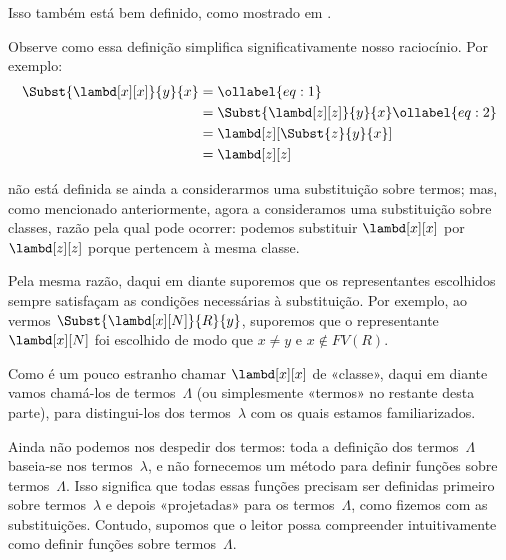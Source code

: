 \documentclass[../../../include/open-logic-section]{subfiles}
\begin{document}
Isso também está bem definido, como mostrado em .

Observe como essa definição simplifica significativamente nosso raciocínio.
Por exemplo:
\begin{align}
  \Subst{\lambd[x][x]}{y}{x} & =\ollabel{eq:1}\\
  &= \Subst{\lambd[z][z]}{y}{x} \ollabel{eq:2}\\
  &= \lambd[z][\Subst{z}{y}{x}] \\
  &= \lambd[z][z]
\end{align}

 não está definida se ainda a considerarmos uma substituição
sobre termos; mas, como mencionado anteriormente, agora a consideramos uma
substituição sobre classes, razão pela qual  pode ocorrer: podemos
substituir $\lambd[x][x]$ por $\lambd[z][z]$ porque pertencem à mesma classe.

Pela mesma razão, daqui em diante suporemos que os representantes escolhidos
sempre satisfaçam as condições necessárias à substituição. Por exemplo, ao
vermos $\Subst{\lambd[x][N]}{R}{y}$, suporemos que o representante
$\lambd[x][N]$ foi escolhido de modo que $x \neq y$ e $x \notin FV(R)$.

Como é um pouco estranho chamar $\lambd[x][x]$ de «classe», daqui em diante
vamos chamá-los de termos~$\Lambda$ (ou simplesmente «termos» no restante
desta parte), para distingui-los dos termos~$\lambda$ com os quais estamos
familiarizados.

\begin{editorial}
  Ainda não podemos nos despedir dos termos: toda a definição dos
  termos~$\Lambda$ baseia-se nos termos~$\lambda$, e não fornecemos um método
  para definir funções sobre termos~$\Lambda$. Isso significa que todas essas
  funções precisam ser definidas primeiro sobre termos~$\lambda$ e depois
  «projetadas» para os termos~$\Lambda$, como fizemos com as substituições.
  Contudo, supomos que o leitor possa compreender intuitivamente como definir
  funções sobre termos~$\Lambda$.
\end{editorial}
\end{document}

